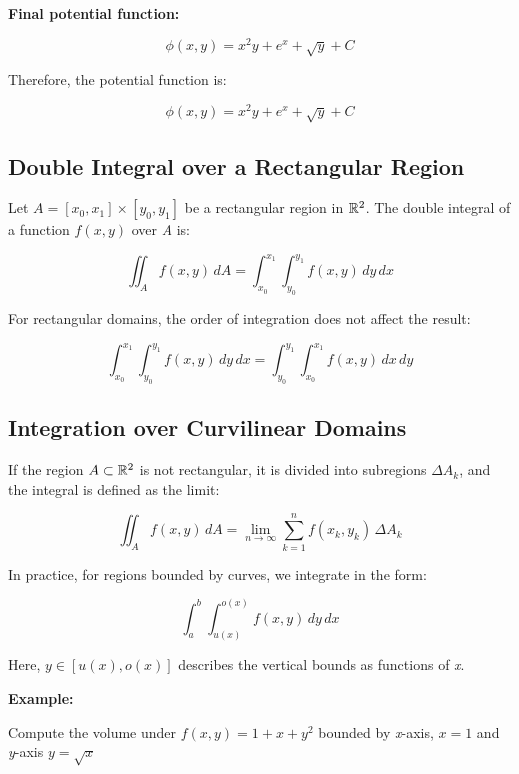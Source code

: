 \textbf{Final potential function:}

\[
    \phi(x, y) = x^2y + e^x + \sqrt{y} + C
\]

Therefore, the potential function is:

\[
    \phi(x, y) = x^2y + e^x + \sqrt{y} + C
\]


\subsection{Double Integral over a Rectangular Region}

Let \( A = [x_0, x_1] \times [y_0, y_1] \) be a rectangular region in \( \mathbb{R}^2 \). The double 
integral of a function \( f(x, y) \) over \emph{A} is:

\[
    \iint_A f(x, y)\, dA = \int_{x_0}^{x_1} \int_{y_0}^{y_1} f(x, y)\, dy\, dx
\]

For rectangular domains, the order of integration does not affect the result:

\[
    \int_{x_0}^{x_1} \int_{y_0}^{y_1} f(x, y)\, dy\, dx = \int_{y_0}^{y_1} \int_{x_0}^{x_1} 
    f(x, y)\, dx\, dy
\]

\subsection{Integration over Curvilinear Domains}

If the region \( A \subset \mathbb{R}^2 \) is not rectangular, it is divided into subregions 
\( \Delta A_k \), and the integral is defined as the limit:

\[
    \iint_A f(x, y)\, dA = \lim_{n \to \infty} \sum_{k=1}^n f(x_k, y_k) \, \Delta A_k
\]

In practice, for regions bounded by curves, we integrate in the form:

\[
    \int_a^b \int_{u(x)}^{o(x)} f(x, y)\, dy\, dx
\]

Here, \( y \in [u(x), o(x)] \) describes the vertical bounds as functions of \emph{x}.
\vspace{\baselineskip}

\textbf{Example:}
\vspace{\baselineskip}

Compute the volume under \(f(x,y) = 1 + x + y^2\) bounded by \emph{x}-axis, \(x = 1\) and \emph{y}-axis 
\(y = \sqrt{x}\)

\begin{center}
\end{center}


